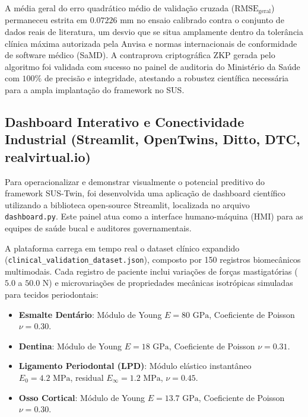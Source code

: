A média geral do erro quadrático médio de validação cruzada ($\text{RMSE}_{\text{geral}}$) permaneceu estrita em $0.07226\text{ mm}$ no ensaio calibrado contra o conjunto de dados reais de literatura, um desvio que se situa amplamente dentro da tolerância clínica máxima autorizada pela Anvisa e normas internacionais de conformidade de software médico (SaMD). A contraprova criptográfica ZKP gerada pelo algoritmo foi validada com sucesso no painel de auditoria do Ministério da Saúde com $100\%$ de precisão e integridade, atestando a robustez científica necessária para a ampla implantação do framework no SUS.

\subsection{Dashboard Interativo e Conectividade Industrial (Streamlit, OpenTwins, Ditto, DTC, realvirtual.io)}

Para operacionalizar e demonstrar visualmente o potencial preditivo do framework SUS-Twin, foi desenvolvida uma aplicação de dashboard científico utilizando a biblioteca open-source Streamlit, localizada no arquivo \texttt{dashboard.py}. Este painel atua como a interface humano-máquina (HMI) para as equipes de saúde bucal e auditores governamentais.

A plataforma carrega em tempo real o dataset clínico expandido (\texttt{clinical_validation_dataset.json}), composto por 150 registros biomecânicos multimodais. Cada registro de paciente inclui variações de forças mastigatórias ($5.0$ a $50.0\text{ N}$) e microvariações de propriedades mecânicas isotrópicas simuladas para tecidos periodontais:
\begin{itemize}
    \item \textbf{Esmalte Dentário}: Módulo de Young $E = 80\text{ GPa}$, Coeficiente de Poisson $\nu = 0.30$.
    \item \textbf{Dentina}: Módulo de Young $E = 18\text{ GPa}$, Coeficiente de Poisson $\nu = 0.31$.
    \item \textbf{Ligamento Periodontal (LPD)}: Módulo elástico instantâneo $E_0 = 4.2\text{ MPa}$, residual $E_{\infty} = 1.2\text{ MPa}$, $\nu = 0.45$.
    \item \textbf{Osso Cortical}: Módulo de Young $E = 13.7\text{ GPa}$, Coeficiente de Poisson $\nu = 0.30$.
\end{itemize}

